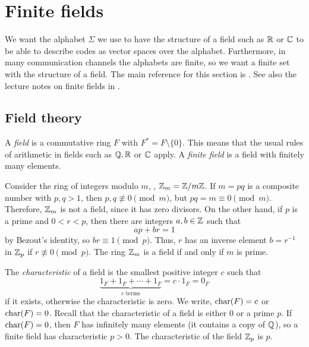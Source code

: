 \documentclass[../main.tex]{subfiles}
\begin{document}
\section{Finite fields}

We want the alphabet $\Sigma$ we use to have the structure of a field such as $\mathbb{R}$ or $\mathbb{C}$ to be able to describe codes as vector spaces over the alphabet. Furthermore, in many communication channels the alphabets are finite, so we want a finite set with the structure of a field. The main reference for this section is \cite[Chapter 3]{ling2004coding}. See also the lecture notes on finite fields in \cite{kopparty2023topics}.

\subsection{Field theory}

A \emph{field} is a commutative ring $F$ with $F^* = F \setminus \{0\}$. This means that the usual rules of arithmetic in fields such as $\mathbb{Q}, \mathbb{R}$ or $\mathbb{C}$ apply. A \emph{finite field} is a field with finitely many elements.

\begin{example}
Consider the ring of integers modulo $m$, \ie, $\mathbb{Z}_m = \mathbb{Z} / m\mathbb{Z}$. If $m = pq$ is a composite number with $p, q > 1$, then $p, q \not\equiv 0 \pmod m$, but $pq = m \equiv 0 \pmod m$. Therefore, $\mathbb{Z}_m$ is not a field, since it has zero divisors. On the other hand, if $p$ is a prime and $0 < r < p$, then there are integers $a, b \in \mathbb{Z}$ such that
\begin{equation*}
    ap + br = 1
\end{equation*}
by Bezout's identity, so $br \equiv 1 \pmod p$. Thus, $r$ has an inverse element $b = r^{-1}$ in $\mathbb{Z}_p$ if $r \not\equiv 0 \pmod p$. The ring $\mathbb{Z}_m$ is a field if and only if $m$ is prime.
\end{example}

The \emph{characteristic} of a field is the smallest positive integer $c$ such that
\begin{equation*}
    \underbrace{1_F + 1_F + \cdots + 1_F}_{\text{$c$ terms}} = c \cdot 1_F = 0_F
\end{equation*}
if it exists, otherwise the characteristic is zero. We write, $\operatorname{char}(F) = c$ or $\operatorname{char}(F) = 0$. Recall that the characteristic of a field is either 0 or a prime $p$. If $\operatorname{char}(F) = 0$, then $F$ has infinitely many elements (it contains a copy of $\mathbb{Q}$), so a finite field has characteristic $p > 0$. The characteristic of the field $\mathbb{Z}_p$ is $p$.
\end{document}

